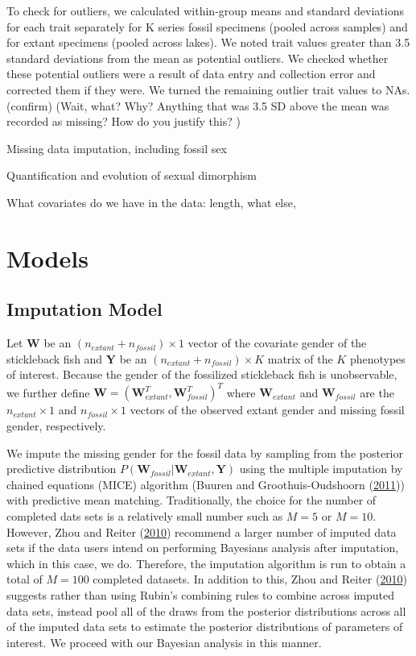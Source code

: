 \documentclass[
  12pt,
]{article}
\begin{document}
To check for outliers, we calculated within-group means and standard
deviations for each trait separately for K series fossil specimens
(pooled across samples) and for extant specimens (pooled across lakes).
We noted trait values greater than 3.5 standard deviations from the mean
as potential outliers. We checked whether these potential outliers were
a result of data entry and collection error and corrected them if they
were. We turned the remaining outlier trait values to NAs. (confirm)
(Wait, what? Why? Anything that was 3.5 SD above the mean was recorded
as missing? How do you justify this? )

Missing data imputation, including fossil sex

Quantification and evolution of sexual dimorphism

What covariates do we have in the data: length, what else,

\hypertarget{sec:models}{%
\section{Models}\label{sec:models}}

\hypertarget{imputation-model}{%
\subsection{Imputation Model}\label{imputation-model}}

Let \(\boldsymbol{W}\) be an \((n_{extant} + n_{fossil}) \times 1\)
vector of the covariate gender of the stickleback fish and
\(\boldsymbol{Y}\) be an \((n_{extant} + n_{fossil}) \times K\) matrix
of the \(K\) phenotypes of interest. Because the gender of the
fossilized stickleback fish is unobservable, we further define
\(\boldsymbol{W} = (\boldsymbol{W}_{extant}^T,\boldsymbol{W}_{fossil}^T)^T\)
where \(\boldsymbol{W}_{extant}\) and \(\boldsymbol{W}_{fossil}\) are
the \(n_{extant} \times 1\) and \(n_{fossil} \times 1\) vectors of the
observed extant gender and missing fossil gender, respectively.

We impute the missing gender for the fossil data by sampling from the
posterior predictive distribution
\(P(\boldsymbol{W}_{fossil}|\boldsymbol{W}_{extant},\boldsymbol{Y})\)
using the multiple imputation by chained equations (MICE) algorithm
(Buuren and Groothuis-Oudshoorn (\protect\hyperlink{ref-MICE}{2011}))
with predictive mean matching. Traditionally, the choice for the number
of completed dats sets is a relatively small number such as \(M = 5\) or
\(M = 10\). However, Zhou and Reiter
(\protect\hyperlink{ref-ZhouReiter2010}{2010}) recommend a larger number
of imputed data sets if the data users intend on performing Bayesians
analysis after imputation, which in this case, we do. Therefore, the
imputation algorithm is run to obtain a total of \(M = 100\) completed
datasets. In addition to this, Zhou and Reiter
(\protect\hyperlink{ref-ZhouReiter2010}{2010}) suggests rather than
using Rubin's combining rules to combine across imputed data sets,
instead pool all of the draws from the posterior distributions across
all of the imputed data sets to estimate the posterior distributions of
parameters of interest. We proceed with our Bayesian analysis in this
manner.
\end{document}
